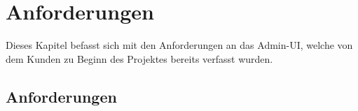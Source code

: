 \section{Anforderungen}
Dieses Kapitel befasst sich mit den Anforderungen an das Admin-UI, welche von dem Kunden zu Beginn des Projektes bereits verfasst wurden.

\subsection[Anforderungen]{Anforderungen}
